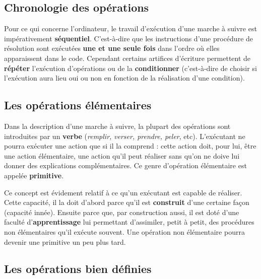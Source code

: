 	\subsection{Chronologie des opérations}

		Pour ce qui concerne l’ordinateur, le travail d’exécution d’une marche à
		suivre est impérativement \textbf{séquentiel}. C’est-à-dire que les
		instructions d’une procédure de résolution sont exécutées \textbf{une
		et une seule fois} dans l’ordre où elles apparaissent dans le code.
		Cependant certains artifices d’écriture permettent de \textbf{répéter}
		l’exécution d’opérations ou de la \textbf{conditionner}
		(c'est-à-dire de choisir si
		l'exécution aura lieu oui ou non en fonction de la
		réalisation d'une condition).

	\subsection{Les opérations élémentaires}


		Dans la description d’une marche à suivre, la plupart des opérations
		sont introduites par un \textbf{verbe
		}(\textit{remplir,}\textbf{\textit{ }}\textit{verser, prendre, peler},
		etc). L’exécutant ne pourra exécuter une action que si il la comprend :
		cette action doit, pour lui, être une action élémentaire, une action
		qu’il peut réaliser sans qu’on ne doive lui donner des explications
		complémentaires. Ce genre d’opération élémentaire est appelée
		\textbf{primitive}.
		
		Ce concept est évidement relatif à ce qu’un exécutant est capable de
		réaliser. Cette capacité, il la doit d’abord parce qu’il est
		\textbf{construit} d’une certaine façon (capacité innée). Ensuite parce
		que, par construction aussi, il est doté d’une faculté
		d’\textbf{apprentissage} lui permettant d’assimiler, petit à petit, des
		procédures non élémentaires qu’il exécute souvent. Une opération non
		élémentaire pourra devenir une primitive un peu plus tard.
		

	\subsection{Les opérations bien définies}

